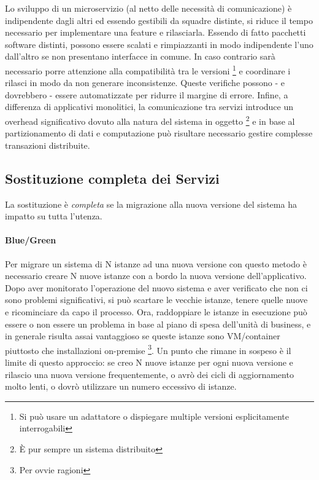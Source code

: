 \documentclass[a4paper,11pt,oneside, table]{article}
\begin{document}
  Lo sviluppo di un microservizio (al netto delle necessit\`a di comunicazione) \`e indipendente dagli altri ed essendo gestibili da squadre distinte, si riduce il tempo necessario per implementare una feature e rilasciarla. Essendo di fatto pacchetti software distinti, possono essere scalati e rimpiazzanti in modo indipendente l'uno dall'altro se non presentano interfacce in comune. In caso contrario sar\`a necessario porre attenzione alla compatibilit\`a tra le versioni \footnote{Si pu\`o usare un adattatore o dispiegare multiple versioni esplicitamente interrogabili} e coordinare i rilasci in modo da non generare inconsistenze. Queste verifiche possono - e dovrebbero - essere automatizzate per ridurre il margine di errore. Infine, a differenza di applicativi monolitici, la comunicazione tra servizi introduce un overhead significativo dovuto alla natura del sistema in oggetto \footnote{\`E pur sempre un sistema distribuito} e in base al partizionamento di dati e computazione pu\`o risultare necessario gestire complesse transazioni distribuite.

  \subsection{Sostituzione completa dei Servizi}

  La sostituzione \`e \textit{completa} se la migrazione alla nuova versione del sistema ha impatto su tutta l'utenza.

  \paragraph{Blue/Green}

  Per migrare un sistema di N istanze ad una nuova versione con questo metodo \`e necessario creare N nuove istanze con a bordo la nuova versione dell'applicativo. Dopo aver monitorato l'operazione del nuovo sistema e aver verificato che non ci sono problemi significativi, si pu\`o scartare le vecchie istanze, tenere quelle nuove e ricominciare da capo il processo. Ora, raddoppiare le istanze in esecuzione pu\`o essere o non essere un problema in base al piano di spesa dell'unit\`a di business, e in generale risulta assai vantaggioso se queste istanze sono VM/container piuttosto che installazioni on-premise \footnote{Per ovvie ragioni}. Un punto che rimane in sospeso \`e il limite di questo approccio: se creo N nuove istanze per ogni nuova versione e rilascio una nuova versione frequentemente, o avr\`o dei cicli di aggiornamento molto lenti, o dovr\`o utilizzare un numero eccessivo di istanze.
\end{document}
